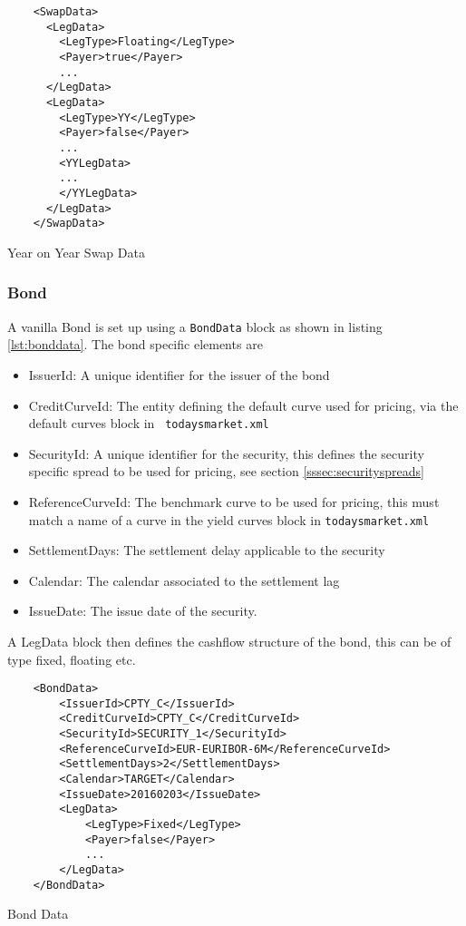 \begin{listing}[H]
\begin{verbatim}
    <SwapData>
      <LegData>
        <LegType>Floating</LegType>
        <Payer>true</Payer>
        ...
      </LegData>
      <LegData>
        <LegType>YY</LegType>
        <Payer>false</Payer>
        ...
        <YYLegData>
        ...
        </YYLegData>
      </LegData>
    </SwapData>
\end{verbatim}
\caption{Year on Year Swap Data}
\label{lst:yyswap}
\end{listing}

\subsubsection{Bond}

A vanilla Bond is set up using a {\tt BondData} block as shown in listing \ref{lst:bonddata}. The bond specific elements
are

\begin{itemize}
\item IssuerId: A unique identifier for the issuer of the bond
\item CreditCurveId: The entity defining the default curve used for pricing, via the default curves block in {\tt
    todaysmarket.xml}
\item SecurityId: A unique identifier for the security, this defines the security specific spread to be used for
  pricing, see section \ref{sssec:securityspreads}
\item ReferenceCurveId: The benchmark curve to be used for pricing, this must match a name of a curve in the yield
  curves block in {\tt todaysmarket.xml}
\item SettlementDays: The settlement delay applicable to the security
\item Calendar: The calendar associated to the settlement lag
\item IssueDate: The issue date of the security.
\end{itemize}

A LegData block then defines the cashflow structure of the bond, this can be of type fixed, floating etc.

\begin{listing}[H]
\begin{verbatim}
    <BondData>
        <IssuerId>CPTY_C</IssuerId>
        <CreditCurveId>CPTY_C</CreditCurveId>
        <SecurityId>SECURITY_1</SecurityId>
        <ReferenceCurveId>EUR-EURIBOR-6M</ReferenceCurveId>
        <SettlementDays>2</SettlementDays>
        <Calendar>TARGET</Calendar>
        <IssueDate>20160203</IssueDate>
        <LegData>
            <LegType>Fixed</LegType>
            <Payer>false</Payer>
            ...
        </LegData>
    </BondData>
\end{verbatim}
\caption{Bond Data}
\label{lst:bonddata}
\end{listing}

